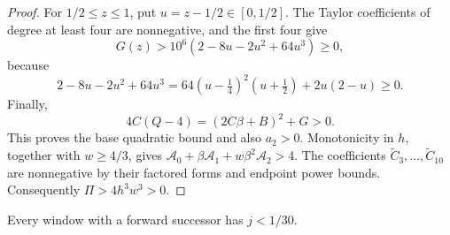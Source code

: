 \begin{proof}
For $1/2\le z\le1$, put $u=z-1/2\in[0,1/2]$.
The Taylor coefficients of degree at least four are nonnegative, and the first four give
\[
 G(z)>10^6(2-8u-2u^2+64u^3)\ge0,
\]
because
\[
 2-8u-2u^2+64u^3
   =64(u-\tfrac14)^2(u+\tfrac12)+2u(2-u)\ge0.
\]
Finally,
\[
 4C(Q-4)=(2C\beta+B)^2+G>0.
\]
This proves the base quadratic bound and also $a_2>0$.
Monotonicity in $h$, together with $w\ge4/3$, gives
$\mathcal A_0+\beta\mathcal A_1+w\beta^2\mathcal A_2>4$.
The coefficients $\widetilde C_3,\dots,\widetilde C_{10}$ are nonnegative by their factored forms
and endpoint power bounds. Consequently $\Pi>4h^3w^3>0$.
\end{proof}

\begin{lemma}\label{lem:m2-large-gap}
Every window with a forward successor has $j<1/30$.
\end{lemma}

